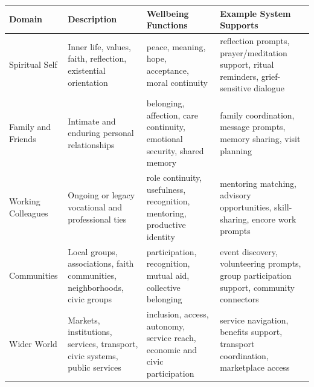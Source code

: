 \documentclass[
  journal,
]{IEEEtran}%
\newcounter{none} %
\begin{document}
\protect{}\label{tab-relationships}
{\def\LTcaptype{none} %
\begin{longtable}[]{@{}
  >{\raggedright\arraybackslash}p{}
  >{\raggedright\arraybackslash}p{}
  >{\raggedright\arraybackslash}p{}
  >{\raggedright\arraybackslash}p{}@{}}
\toprule\noalign{}
\begin{minipage}[b]{\linewidth}\raggedright
Domain
\end{minipage} & \begin{minipage}[b]{\linewidth}\raggedright
Description
\end{minipage} & \begin{minipage}[b]{\linewidth}\raggedright
Wellbeing Functions
\end{minipage} & \begin{minipage}[b]{\linewidth}\raggedright
Example System Supports
\end{minipage} \\
\midrule\noalign{}
\endhead
\bottomrule\noalign{}
\endlastfoot
Spiritual Self & Inner life, values, faith, reflection, existential
orientation & peace, meaning, hope, acceptance, moral continuity &
reflection prompts, prayer/meditation support, ritual reminders,
grief-sensitive dialogue \\
Family and Friends & Intimate and enduring personal relationships &
belonging, affection, care continuity, emotional security, shared memory
& family coordination, message prompts, memory sharing, visit
planning \\
Working Colleagues & Ongoing or legacy vocational and professional ties
& role continuity, usefulness, recognition, mentoring, productive
identity & mentoring matching, advisory opportunities, skill-sharing,
encore work prompts \\
Communities & Local groups, associations, faith communities,
neighborhoods, civic groups & participation, recognition, mutual aid,
collective belonging & event discovery, volunteering prompts, group
participation support, community connectors \\
Wider World & Markets, institutions, services, transport, civic systems,
public services & inclusion, access, autonomy, service reach, economic
and civic participation & service navigation, benefits support,
transport coordination, marketplace access \\
\end{longtable}
}
\end{document}
